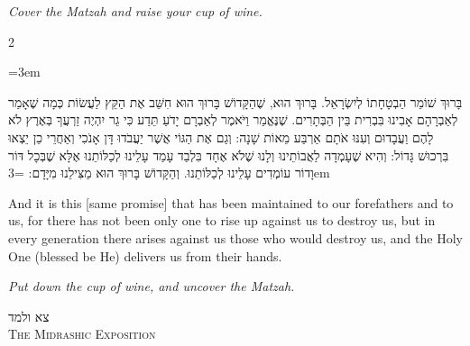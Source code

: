 \documentclass[11pt, openany]{book}
\newcommand{\instruction}[1]{%
  \par\vspace{3pt}
  \begin{tcolorbox}[
    enhanced,
    breakable,
    colback=sederlight,
    colframe=sederlight,
    boxrule=0pt,
    left=10pt,
    right=6pt,
    top=4pt,
    bottom=4pt,
    borderline west={2pt}{0pt}{sederwine!60},
    arc=0pt,
    outer arc=0pt,
  ]
    {\small\itshape\textcolor{sederwine}{#1}}
  \end{tcolorbox}
  \par\vspace{2pt}
}
\newenvironment{bilingual}{%
  \par\vspace{4pt}%
  \begin{paracol}{2}%
}{%
  \end{paracol}%
  \par\vspace{2pt}%
}
\newenvironment{hebrewcol}{%
  \switchcolumn[1]%
  \begingroup
  \RTL
  \hebrewfont\large
  \setstretch{1.4}%
  \emergencystretch=3em
  \tolerance=9999
  \parindent=0pt\relax
}{%
  \endRTL
  \endgroup
}
\newenvironment{englishcol}{%
  \switchcolumn[0]%
  \begingroup
  \setstretch{1.4}%
  \emergencystretch=3em
  \tolerance=9999
  \normalsize
  \rightskip=0.12in\relax
}{%
  \endgroup
}
\newcommand{\subsedertitle}[2]{%
  \par\vspace{8pt}
  \begin{center}
    {\hebrewfontsanslarge\textcolor{sederblue}{\beginR #1\endR}}\\[3pt]
    {\normalsize\scshape\textcolor{sederblue}{#2}}
  \end{center}
  \par\vspace{3pt}
}
\begin{document}
\instruction{Cover the Matzah and raise your cup of wine.}

\begin{bilingual}
\begin{hebrewcol}
בָּרוּךְ שׁוֹמֵר הַבְטָחָתוֹ לְיִשְׂרָאֵל. בָּרוּךְ הוּא, שֶׁהַקָּדוֹשׁ בָּרוּךְ הוּא חִשֵּׁב אֶת הַקֵּץ לַעֲשׂוֹת כְּמָה שֶׁאָמַר לְאַבְרָהָם אָבִינוּ בִּבְרִית בֵּין הַבְּתָרִים. שֶׁנֶּאֱמַר וַיֹּאמֶר לְאַבְרָם יָדֹעַ תֵּדַע כִּי גֵר יִהְיֶה זַרְעֲךָ בְּאֶרֶץ לֹא לָהֶם וַעֲבָדוּם וְעִנּוּ אֹתָם אַרְבַּע מֵאוֹת שָׁנָה: וְגַם אֶת הַגּוֹי אֲשֶׁר יַעֲבֹדוּ דָּן אָנֹכִי וְאַחֲרֵי כֵן יֵצְאוּ בִּרְכוּשׁ גָּדוֹל:
וְהִיא שֶׁעָמְדָה לַאֲבוֹתֵינוּ וְלָנוּ שֶׁלֹא אֶחָד בִּלְבַד עָמַד עָלֵינוּ לְכַלּוֹתֵנוּ אֶלָּא שֶׁבְּכָל דּוֹר וָדוֹר עוֹמְדִים עָלֵינוּ לְכַלּוֹתֵנוּ. וְהַקָּדוֹשׁ בָּרוּךְ הוּא מַצִּילֵנוּ מִיָּדָם:
\end{hebrewcol}
\begin{englishcol}
And it is this [same promise] that has been maintained to our forefathers and to us, for there has not been only one to rise up against us to destroy us, but in every generation there arises against us those who would destroy us, and the Holy One (blessed be He) delivers us from their hands.
\end{englishcol}
\end{bilingual}
\instruction{Put down the cup of wine, and uncover the Matzah.}

\subsedertitle{צא ולמד}{The Midrashic Exposition}
\end{document}
